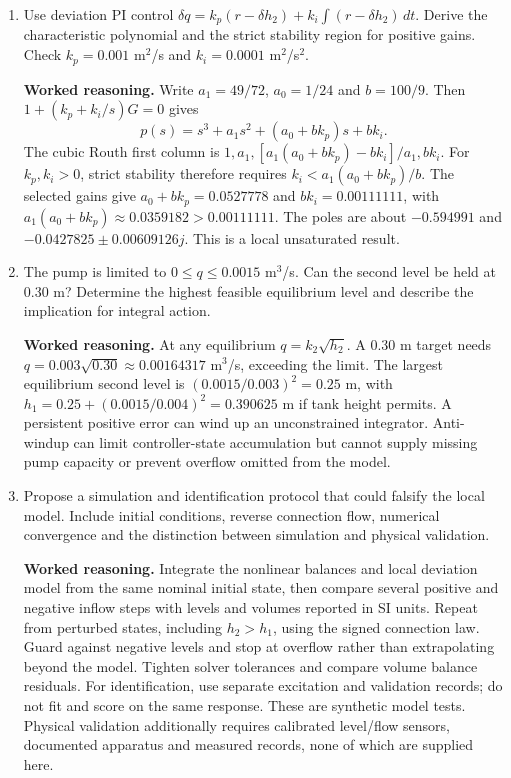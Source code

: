 \documentclass[10pt,a4paper]{article}
\newcommand{\answer}{\par\smallskip\textbf{Worked reasoning.} }
\begin{document}
\begin{enumerate}
\item Use deviation PI control $\delta q=k_p(r-\delta h_2)+k_i\int(r-\delta h_2)\,dt$. Derive the characteristic polynomial and the strict stability region for positive gains. Check $k_p=0.001$ m$^2$/s and $k_i=0.0001$ m$^2$/s$^2$.
\answer Write $a_1=49/72$, $a_0=1/24$ and $b=100/9$. Then $1+(k_p+k_i/s)G=0$ gives
\[
p(s)=s^3+a_1s^2+(a_0+bk_p)s+bk_i.
\]
The cubic Routh first column is $1,a_1,[a_1(a_0+bk_p)-bk_i]/a_1,bk_i$. For $k_p,k_i>0$, strict stability therefore requires $k_i<a_1(a_0+bk_p)/b$. The selected gains give $a_0+bk_p=0.0527778$ and $bk_i=0.00111111$, with $a_1(a_0+bk_p)\approx0.0359182>0.00111111$. The poles are about $-0.594991$ and $-0.0427825\pm0.00609126j$. This is a local unsaturated result.
\item The pump is limited to $0\le q\le0.0015$ m$^3$/s. Can the second level be held at 0.30 m? Determine the highest feasible equilibrium level and describe the implication for integral action.
\answer At any equilibrium $q=k_2\sqrt{h_2}$. A 0.30 m target needs $q=0.003\sqrt{0.30}\approx0.00164317$ m$^3$/s, exceeding the limit. The largest equilibrium second level is $(0.0015/0.003)^2=0.25$ m, with $h_1=0.25+(0.0015/0.004)^2=0.390625$ m if tank height permits. A persistent positive error can wind up an unconstrained integrator. Anti-windup can limit controller-state accumulation but cannot supply missing pump capacity or prevent overflow omitted from the model.
\item Propose a simulation and identification protocol that could falsify the local model. Include initial conditions, reverse connection flow, numerical convergence and the distinction between simulation and physical validation.
\answer Integrate the nonlinear balances and local deviation model from the same nominal initial state, then compare several positive and negative inflow steps with levels and volumes reported in SI units. Repeat from perturbed states, including $h_2>h_1$, using the signed connection law. Guard against negative levels and stop at overflow rather than extrapolating beyond the model. Tighten solver tolerances and compare volume balance residuals. For identification, use separate excitation and validation records; do not fit and score on the same response. These are synthetic model tests. Physical validation additionally requires calibrated level/flow sensors, documented apparatus and measured records, none of which are supplied here.
\end{enumerate}
\end{document}
